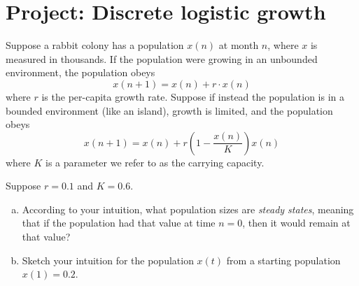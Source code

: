 \documentclass{exam}
\begin{document}
\section*{Project: Discrete logistic growth}
 
Suppose a rabbit colony has a population $x(n)$ at month $n$, where $x$ is measured in thousands. If the population were growing in an unbounded environment, the population obeys
\begin{equation}
x(n+1) = x(n) + r \cdot x(n)
\end{equation} 
where $r$ is the per-capita growth rate. Suppose if instead the population is in a bounded environment (like an island), growth is limited, and the population obeys
\begin{equation}
x(n+1) = x(n) + r \left( 1- \frac{x(n)}{K}\right) x(n)
\end{equation} 
where $K$ is a parameter we refer to as the carrying capacity. 

Suppose $r=0.1$ and $K=0.6$. 
\begin{enumerate}[a.]
\item According to your intuition, what population sizes are \textit{steady states}, meaning that if the population had that value at time $n=0$, then it would remain at that value?
\item Sketch your intuition for the population $x(t)$ from a starting population $x(1)=0.2$. 
\end{enumerate}
\end{document}
